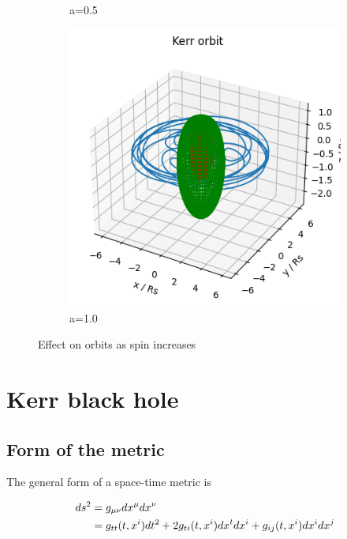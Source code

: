 \begin{figure}[h]
\begin{subfigure}[b]{0.3\textwidth}
         \caption{a=0.5}
         \label{fig:Kerr orbit, a=0.5}
     \end{subfigure}
     \hfill
     \begin{subfigure}[b]{0.3\textwidth}
         \centering
         \includegraphics[width=\textwidth]{orbits_images/kerr_a=1.png}
         \caption{a=1.0}
         \label{fig:Kerr orbit, a=1.0}
     \end{subfigure}
        \caption{Effect on orbits as spin increases}
        \label{fig:Effect of spin on orbit}
\end{figure}


\section{Kerr black hole}\label{sec:Kerr BH}

\subsection{Form of the metric}

The general form of a space-time metric is

\begin{alignat}{1}
    ds^2&=g_{\mu \nu} dx^{\mu} dx^{\nu}\notag\\
    &=g_{tt}(t,x^i) dt^2 + 2 g_{ti}(t, x^i) dx^t dx^i + g_{ij}(t, x^i) dx^i dx^j
\label{eq:general form of metric}
\end{alignat}


